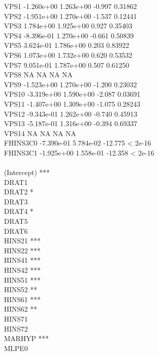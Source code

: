 \documentclass[12pt]{article}
\begin{document}
VPS1        -1.260e+00  1.263e+00  -0.997  0.31862\\
VPS2        -1.951e+00  1.270e+00  -1.537  0.12441\\
VPS3         1.784e+00  1.925e+00   0.927  0.35403\\
VPS4        -8.396e-01  1.270e+00  -0.661  0.50839\\
VPS5         3.624e-01  1.786e+00   0.203  0.83922\\
VPS6         1.073e+00  1.732e+00   0.620  0.53532\\
VPS7         9.051e-01  1.787e+00   0.507  0.61250\\
VPS8                NA         NA      NA       NA\\
VPS9        -1.523e+00  1.270e+00  -1.200  0.23032\\
VPS10       -3.319e+00  1.590e+00  -2.087  0.03691\\
VPS11       -1.407e+00  1.309e+00  -1.075  0.28243\\
VPS12       -9.343e-01  1.262e+00  -0.740  0.45913\\
VPS13       -5.187e-01  1.316e+00  -0.394  0.69337\\
VPS14               NA         NA      NA       NA\\
FHINS3C0    -7.390e-01  5.784e-02 -12.775  < 2e-16\\
FHINS3C1    -1.925e+00  1.558e-01 -12.358  < 2e-16\\
               \\
(Intercept) ***\\
DRAT1          \\
DRAT2       *  \\
DRAT3          \\
DRAT4       *  \\
DRAT5          \\
DRAT6          \\
HINS21      ***\\
HINS22      ***\\
HINS41      ***\\
HINS42      ***\\
HINS51      ***\\
HINS52      ** \\
HINS61      ***\\
HINS62      ** \\
HINS71         \\
HINS72         \\
MARHYP      ***\\
MLPE0          \\
\end{document}
